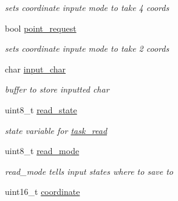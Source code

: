 \begin{DoxyCompactItemize}
\begin{DoxyCompactList}\small\item\em sets coordinate inpute mode to take 4 coords \end{DoxyCompactList}\item 
\hypertarget{classtask__read_a2c93078e8889902a8b94a7f9ff4f9aee}{bool \hyperlink{classtask__read_a2c93078e8889902a8b94a7f9ff4f9aee}{point\-\_\-request}}\label{classtask__read_a2c93078e8889902a8b94a7f9ff4f9aee}

\begin{DoxyCompactList}\small\item\em sets coordinate inpute mode to take 2 coords \end{DoxyCompactList}\item 
\hypertarget{classtask__read_a7f3dadb9f0fe73bb72860e48ea9e9506}{char \hyperlink{classtask__read_a7f3dadb9f0fe73bb72860e48ea9e9506}{input\-\_\-char}}\label{classtask__read_a7f3dadb9f0fe73bb72860e48ea9e9506}

\begin{DoxyCompactList}\small\item\em buffer to store inputted char \end{DoxyCompactList}\item 
\hypertarget{classtask__read_a9105eff17956d2c454d8461667c5c4ce}{uint8\-\_\-t \hyperlink{classtask__read_a9105eff17956d2c454d8461667c5c4ce}{read\-\_\-state}}\label{classtask__read_a9105eff17956d2c454d8461667c5c4ce}

\begin{DoxyCompactList}\small\item\em state variable for \hyperlink{classtask__read}{task\-\_\-read} \end{DoxyCompactList}\item 
\hypertarget{classtask__read_a637368ee975b788a55fe0dd0b8c38829}{uint8\-\_\-t \hyperlink{classtask__read_a637368ee975b788a55fe0dd0b8c38829}{read\-\_\-mode}}\label{classtask__read_a637368ee975b788a55fe0dd0b8c38829}

\begin{DoxyCompactList}\small\item\em read\-\_\-mode tells input states where to save to \end{DoxyCompactList}\item 
\hypertarget{classtask__read_a41dff54c822ebbbf499d320e6e069790}{uint16\-\_\-t \hyperlink{classtask__read_a41dff54c822ebbbf499d320e6e069790}{coordinate}}\label{classtask__read_a41dff54c822ebbbf499d320e6e069790}


\end{DoxyCompactItemize}
